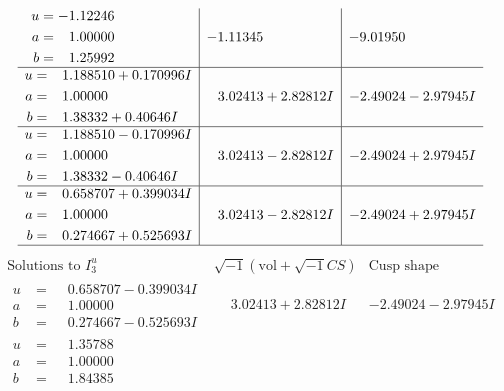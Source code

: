 \documentclass[1p]{elsarticle_modified}
\theoremstyle{definition}
\newcommand{\I}{\sqrt{-1}}
\begin{document}
$$\begin{array}{c|c|c}
\begin{aligned}
u &= -1.12246\phantom{ +0.000000I} \\
a &= \phantom{-}1.00000\phantom{ +0.000000I} \\
b &= \phantom{-}1.25992\phantom{ +0.000000I}\end{aligned}
 & -1.11345\phantom{ +0.000000I} & -9.01950\phantom{ +0.000000I} \\ \hline\begin{aligned}
u &= \phantom{-}1.188510 + 0.170996 I \\
a &= \phantom{-}1.00000\phantom{ +0.000000I} \\
b &= \phantom{-}1.38332 + 0.40646 I\end{aligned}
 & \phantom{-}3.02413 + 2.82812 I & -2.49024 - 2.97945 I \\ \hline\begin{aligned}
u &= \phantom{-}1.188510 - 0.170996 I \\
a &= \phantom{-}1.00000\phantom{ +0.000000I} \\
b &= \phantom{-}1.38332 - 0.40646 I\end{aligned}
 & \phantom{-}3.02413 - 2.82812 I & -2.49024 + 2.97945 I \\ \hline\begin{aligned}
u &= \phantom{-}0.658707 + 0.399034 I \\
a &= \phantom{-}1.00000\phantom{ +0.000000I} \\
b &= \phantom{-}0.274667 + 0.525693 I\end{aligned}
 & \phantom{-}3.02413 - 2.82812 I & -2.49024 + 2.97945 I\\
 \hline 
 \end{array}$$\newpage$$\begin{array}{c|c|c}  
\text{Solutions to }I^u_{3}& \I (\text{vol} + \sqrt{-1}CS) & \text{Cusp shape}\\
 \hline 
\begin{aligned}
u &= \phantom{-}0.658707 - 0.399034 I \\
a &= \phantom{-}1.00000\phantom{ +0.000000I} \\
b &= \phantom{-}0.274667 - 0.525693 I\end{aligned}
 & \phantom{-}3.02413 + 2.82812 I & -2.49024 - 2.97945 I \\ \hline\begin{aligned}
u &= \phantom{-}1.35788\phantom{ +0.000000I} \\
a &= \phantom{-}1.00000\phantom{ +0.000000I} \\
b &= \phantom{-}1.84385\phantom{ +0.000000I}\end{aligned}

\end{array}$$
\end{document}
